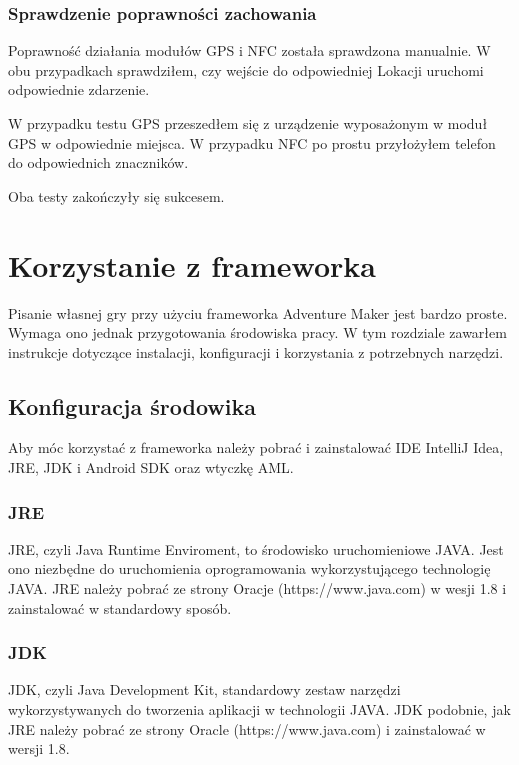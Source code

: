 \documentclass{xmgr}
\begin{document}
\subsection{Sprawdzenie poprawności zachowania}

Poprawność działania modułów GPS i NFC została sprawdzona manualnie. W obu przypadkach sprawdziłem, czy wejście do odpowiedniej Lokacji uruchomi odpowiednie zdarzenie.

W przypadku testu GPS przeszedłem się z urządzenie wyposażonym w moduł GPS w odpowiednie miejsca. W przypadku NFC po prostu przyłożyłem telefon do odpowiednich znaczników. 

Oba testy zakończyły się sukcesem.  

\chapter{Korzystanie z frameworka}
Pisanie własnej gry przy użyciu frameworka Adventure Maker jest bardzo proste. Wymaga ono jednak przygotowania środowiska pracy. W tym rozdziale zawarłem instrukcje dotyczące instalacji, konfiguracji i korzystania z potrzebnych narzędzi. 

\section{Konfiguracja środowika}

Aby móc korzystać z frameworka należy pobrać i zainstalować IDE IntelliJ Idea, JRE, JDK i Android SDK oraz wtyczkę AML.

\subsection{JRE}

JRE, czyli Java Runtime Enviroment, to środowisko uruchomieniowe JAVA. Jest ono 
niezbędne do uruchomienia oprogramowania wykorzystującego technologię JAVA. JRE należy pobrać ze strony Oracje (https://www.java.com) w wesji 1.8 i zainstalować w standardowy sposób.

\subsection{JDK}

JDK, czyli Java Development Kit, standardowy zestaw narzędzi wykorzystywanych do tworzenia aplikacji w technologii JAVA. JDK podobnie, jak JRE należy pobrać ze strony Oracle (https://www.java.com) i zainstalować w wersji 1.8.
\end{document}
